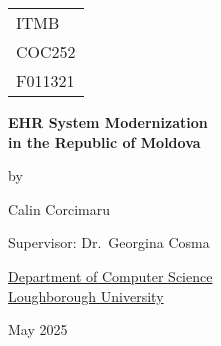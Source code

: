 

\thispagestyle{empty}

\fancypage{}{\fbox}

\begin{center}

\Large{
\hfill \begin{tabular}{l}
ITMB \\
COC252 \\
F011321
\end{tabular}
}


\vspace*{\fill}

\Large{\textbf{EHR System Modernization \\
in the Republic of Moldova}}

\vspace*{\fill}

by

\vspace*{\fill}

Calin Corcimaru


\vspace*{\fill}
Supervisor: Dr.\ Georgina Cosma
\vspace*{\fill}

\underline{Department of Computer Science} \\
\underline{Loughborough University}

\vspace*{\fill}
May 2025

\end{center}


\fancypage{}{}


